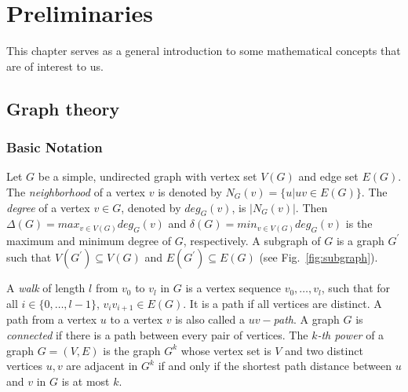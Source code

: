 \chapter{Preliminaries}
\label{chap:preliminaries}
This chapter serves as a general introduction to some mathematical concepts that are of interest to us.
\section{Graph theory}

\subsection{Basic Notation}
Let $G$ be a simple, undirected graph with vertex set $V(G)$ and edge set $E(G)$. The \textit{neighborhood} of a vertex $v$ is denoted by
$N_{G}(v) = \{u | uv \in E(G)\}$. The \textit{degree} of a vertex $v \in G$, denoted by $deg_{G}(v)$, is $|N_{G}(v)|$. Then
$\Delta(G) = max_{v \in V(G)} deg_{G}(v)$ and $\delta(G) = min_{v \in V(G)} deg_{G}(v) $ is the maximum and minimum degree of $G$, respectively.
A subgraph of $G$ is a graph $G^{'}$ such that $V(G^{'}) \subseteq V(G)$ and $E(G^{'}) \subseteq E(G)$ (see Fig.~\ref{fig:subgraph}).

A \textit{walk} of length $l$ from $v_0$ to $v_l$ in $G$ is a vertex sequence $v_0, \dots ,v_{l}$, such that for all
$i \in \{0,\dots,l-1\}$, $v_{i}v_{i+1} \in E(G)$. It is a path if all vertices are distinct. A path from a vertex $u$ to a vertex $v$ is also
called a \textit{$uv-$path}. A graph $G$ is \textit{connected} if there is a path between every pair of vertices. The \textit{$k$-th power} of
a graph $G = (V,E)$ is the graph $G^{k}$ whose vertex set is $V$ and two distinct vertices $u,v$ are adjacent in $G^{k}$ if and only if the
shortest path distance between $u$ and $v$ in $G$ is at most $k$.

